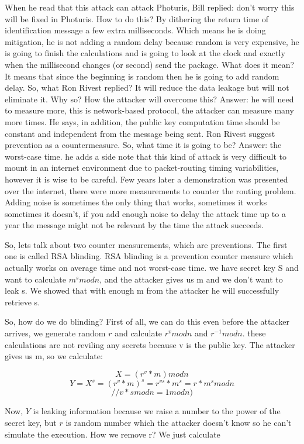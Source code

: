 When he read that this attack can attack Photuris, Bill replied: don't worry this will be fixed in Photuris. How to do this? By dithering the return time of identification message a few extra milliseconds. Which means he is doing mitigation, he is not adding a random delay because random is very expensive, he is going to finish the calculations and is going to look at the clock and exactly when the millisecond changes (or second) send the package. What does it mean? It means that since the beginning is random then he is going to add random delay. So, what Ron Rivest replied? It will reduce the data leakage but will not eliminate it. Why so? How the attacker will overcome this? Answer: he will need to measure more, this is network-based protocol, the attacker can measure many more times. He says, in addition, the public key computation time should be constant and independent from the message being sent. Ron Rivest suggest prevention as a countermeasure. So, what time it is going to be? Answer: the worst-case time. he adds a side note that this kind of attack is very difficult to mount in an internet environment due to packet-routing timing variabilities, however it is wise to be careful. Few years later a demonstration was presented over the internet, there were more measurements to counter the routing problem. Adding noise is sometimes the only thing that works, sometimes it works sometimes it doesn't, if you add enough noise to delay the attack time up to a year the message might not be relevant by the time the attack succeeds.

So, lets talk about two counter measurements, which are preventions. The first one is called RSA blinding. RSA blinding is a prevention counter measure which actually works on average time and not worst-case time. we have secret key S and want to calculate \(m^s mod n\), and the attacker gives us m and we don't want to leak s. We showed that with enough m from the attacker he will successfully retrieve s. 

So, how do we do blinding? First of all, we can do this even before the attacker arrives, we generate random $r$ and calculate \(r^v mod n\) and \(r^{-1} mod n\). these calculations are not reviling any secrets because v is the public key. The attacker gives us m, so we calculate: 

\[X = (r^v * m) mod n\]
\[Y = X^s = (r^v*m)^s = r^{vs}*m^s = r*m^s mod n \] 
\[ // v*s mod n = 1 mod n)\]

Now, $Y$ is leaking information because we raise a number to the power of the secret key, but $r$ is random number which the attacker doesn't know so he can't simulate the execution. How we remove r? We just calculate 

